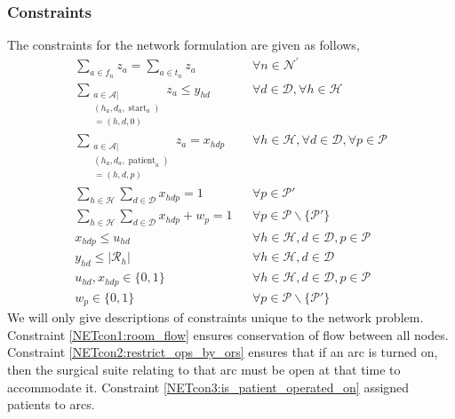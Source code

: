     \subsubsection*{Constraints} The constraints for the network formulation are given as follows,
    \begin{align}
        \sum\limits_{a \in f_n} z_a = \sum\limits_{a \in t_n} z_a 
            && \forall n \in \mathcal{N}^\prime \label{NETcon1:room_flow}\\
        \sum\limits_{\substack{a \in \mathcal{A} | \\ (h_a, d_a, \operatorname{start}_a) \\= (h,d,0)}}z_a \leq y_{hd}
            && \forall d \in \mathcal{D}, \forall h \in \mathcal{H}\label{NETcon2:restrict_ops_by_ors}\\
        \sum\limits_{\substack{a \in \mathcal{A} |\\ (h_a,d_a,\operatorname{patient}_a)\\ =(h,d,p)}}z_a= x_{hdp}
            && \forall h \in \mathcal{H}, \forall d \in \mathcal{D}, \forall p \in \mathcal{P}  \label{NETcon3:is_patient_operated_on} \\
        \sum\limits_{h \in \mathcal{H}} \sum\limits_{d \in \mathcal{D}}x_{hdp} = 1 
            && \forall p \in \mathcal{P}' \label{NETcon4:must_do_mandatory}\\
        \sum\limits_{h \in \mathcal{H}} \sum\limits_{d \in \mathcal{D}} x_{hdp} + w_p = 1
            && \forall p \in \mathcal{P} \backslash \{\mathcal{P}'\}\label{NETcon5:turn_on_w}\\
        x_{hdp} \leq u_{hd}
            && \forall h \in \mathcal{H}, d \in \mathcal{D}, p \in \mathcal{P}\label{NETcon5:force_hosp_on}\\
            y_{hd} \leq |\mathcal{R}_h|
            && \forall h\in\mathcal{H}, d \in \mathcal{D} \label{NETcon6:max_OR}\\
            u_{hd}, x_{hdp} \in \{ 0,1\}
            && \forall h\in \mathcal{H}, d \in \mathcal{D}, p \in \mathcal{P}\label{con8}\\
            w_p \in \{0,1\}
            && \forall p \in \mathcal{P} \backslash\{\mathcal{P}'\}\label{con9}
    \end{align}
    We will only give descriptions of constraints unique to the network problem. Constraint \ref{NETcon1:room_flow} ensures conservation of flow between all nodes. Constraint \ref{NETcon2:restrict_ops_by_ors} ensures that if an arc is turned on, then the surgical suite relating to that arc must be open at that time to accommodate it. Constraint \ref{NETcon3:is_patient_operated_on} assigned patients to arcs.